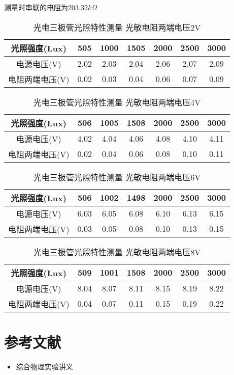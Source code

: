 \documentclass{ctexart}
\begin{document}
测量时串联的电阻为$203.32k\Omega$

\begin{table*}[!htbp]
  \centering
  \begin{tabular}{|c|c|c|c|c|c|c|}
    \hline
    光照强度(Lux) &505&1000&1505&2000&2500&3000\\\hline
    电源电压(V) &2.02&2.03&2.04&2.06&2.07&2.09\\\hline
    电阻两端电压(V) &0.02&0.03&0.04&0.06&0.07&0.09\\\hline
  \end{tabular}
  \caption{光电三极管光照特性测量 光敏电阻两端电压2V}
\end{table*}

\begin{table*}[!htbp]
  \centering
  \begin{tabular}{|c|c|c|c|c|c|c|}
    \hline
    光照强度(Lux) &506&1005&1508&2000&2500&3000\\\hline
    电源电压(V) &4.02&4.04&4.06&4.08&4.10&4.11\\\hline
    电阻两端电压(V) &0.02&0.04&0.06&0.08&0.10&0.11\\\hline
  \end{tabular}
  \caption{光电三极管光照特性测量 光敏电阻两端电压4V}
\end{table*}

\begin{table*}[!htbp]
  \centering
  \begin{tabular}{|c|c|c|c|c|c|c|}
    \hline
    光照强度(Lux) &506&1002&1498&2000&2500&3000\\\hline
    电源电压(V) &6.03&6.05&6.08&6.10&6.13&6.15\\\hline
    电阻两端电压(V) &0.03&0.05&0.08&0.10&0.13&0.15\\\hline
  \end{tabular}
  \caption{光电三极管光照特性测量 光敏电阻两端电压6V}
\end{table*}

\begin{table*}[!htbp]
  \centering
  \begin{tabular}{|c|c|c|c|c|c|c|}
    \hline
    光照强度(Lux) &509&1001&1508&2000&2500&3000\\\hline
    电源电压(V) &8.04&8.07&8.11&8.15&8.19&8.22\\\hline
    电阻两端电压(V) &0.04&0.07&0.11&0.15&0.19&0.22\\\hline
  \end{tabular}
  \caption{光电三极管光照特性测量 光敏电阻两端电压8V}
\end{table*}

\clearpage

\section{参考文献}
\begin{itemize}[leftmargin=0pt]
  \item[] 综合物理实验讲义
\end{itemize}
\end{document}
